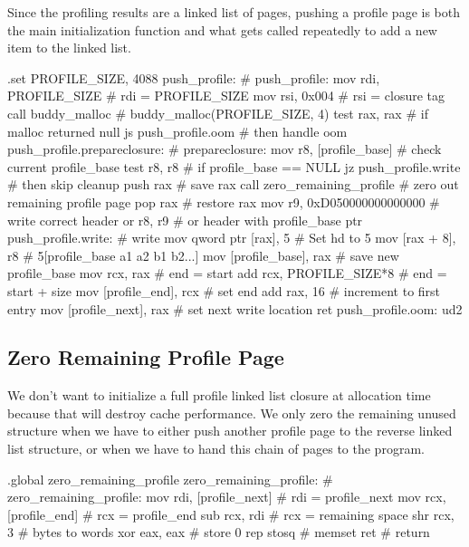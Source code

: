 Since the profiling results are a linked list of pages, pushing a profile page
is both the main initialization function and what gets called repeatedly to add
a new item to the linked list.

\begin{asm}
.set	PROFILE_SIZE,	4088
push_profile:				    # push_profile:
	mov	rdi, PROFILE_SIZE	    #   rdi = PROFILE_SIZE
	mov	rsi, 0x004		    #   rsi = closure tag
	call	buddy_malloc		    #   buddy_malloc(PROFILE_SIZE, 4)
	test	rax, rax		    #   if malloc returned null
	js	push_profile.oom	    #   then handle oom
push_profile.prepareclosure:		    # prepareclosure:
	mov	r8, [profile_base]	    #   check current profile_base
	test	r8, r8			    #   if profile_base == NULL
	jz	push_profile.write	    #   then skip cleanup
	push	rax			    #   save rax
	call	zero_remaining_profile	    #   zero out remaining profile page
	pop	rax			    #   restore rax
	mov	r9, 0xD050000000000000	    #   write correct header
	or	r8, r9			    #   or header with profile_base ptr
push_profile.write:			    # write
	mov	qword ptr [rax], 5	    #   Set hd to 5
	mov	[rax + 8], r8		    #   5[profile_base a1 a2 b1 b2...]
	mov	[profile_base], rax	    #   save new profile_base
	mov	rcx, rax		    #   end = start
	add	rcx, PROFILE_SIZE*8	    #   end = start + size
	mov	[profile_end], rcx	    #   set end
	add	rax, 16			    #   increment to first entry
	mov	[profile_next], rax	    #   set next write location
	ret
push_profile.oom:
	ud2
\end{asm}

\subsection{Zero Remaining Profile Page}

We don't want to initialize a full profile linked list closure at allocation
time because that will destroy cache performance. We only zero the remaining
unused structure when we have to either push another profile page to the
reverse linked list structure, or when we have to hand this chain of pages to
the program.

\begin{asm}
.global zero_remaining_profile
zero_remaining_profile:			    # zero_remaining_profile:
	mov	rdi, [profile_next]	    #   rdi = profile_next
	mov	rcx, [profile_end]	    #   rcx = profile_end
	sub	rcx, rdi		    #   rcx = remaining space
	shr	rcx, 3 			    #   bytes to words
	xor	eax, eax		    #   store 0
	rep	stosq			    #   memset
	ret				    #   return
\end{asm}

